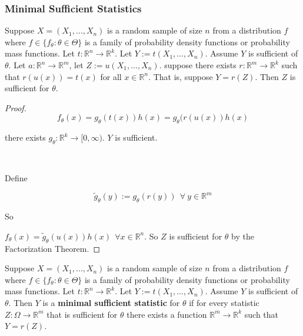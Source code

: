 \subsubsection{Minimal Sufficient Statistics}

\begin{proposition}

Suppose \(X = (X_1, \ldots, X_n)\) is a random sample of size \(n\) from a distribution \(f\) where \(f \in \{f_\theta: \theta \in \Theta \}\) is a family of probability density functions or probability mass functions. Let \(t: \mathbb{R}^n \to \mathbb{R}^k\). Let \(Y:= t(X_1, \ldots, X_n)\). Assume \(Y\) is sufficient of \(\theta\). Let \(a: \mathbb{R}^n \to \mathbb{R}^m\), let \(Z:=u(X_1, \ldots, X_n)\). suppose there exists \(r: \mathbb{R}^m \to \mathbb{R}^k\) such that \(r(u(x)) = t(x)\) for all \(x \in \mathbb{R}^n\). That is, suppose \(Y = r(Z)\). Then \(Z\) is sufficient for \(\theta\).

\end{proposition}

\begin{proof}

\[
f_\theta(x) = g_\theta(t(x)) h(x) = g_\theta(r(u(x)) h(x)
\]


there exists \(g_\theta: \mathbb{R}^k \to [0, \infty)\). \(Y\) is sufficient.

\

Define 

\[
\tilde{g}_\theta(y) := g_\theta(r(y)) \ \ \forall \ y \in \mathbb{R}^m
\]

So

\(f_\theta(x) = \tilde{g}_\theta(u(x)) h(x) \ \ \forall x \in \mathbb{R}^n\). So \(Z\) is sufficient for \(\theta\) by the Factorization Theorem.

\end{proof}

\begin{definition} Suppose \(X = (X_1, \ldots, X_n)\) is a random sample of size \(n\) from a distribution \(f\) where \(f \in \{f_\theta: \theta \in \Theta \}\) is a family of probability density functions or probability mass functions. Let \(t: \mathbb{R}^n \to \mathbb{R}^k\). Let \(Y:= t(X_1, \ldots, X_n)\). Assume \(Y\) is sufficient of \(\theta\). Then \(Y\) is a \textbf{minimal sufficient statistic} for \(\theta\) if for every statistic \(Z: \Omega \to \mathbb{R}^m\) that is sufficient for \(\theta\) there exists a function \(\mathbb{R}^m \to \mathbb{R}^k\) such that \(Y = r(Z)\).

\end{definition}

